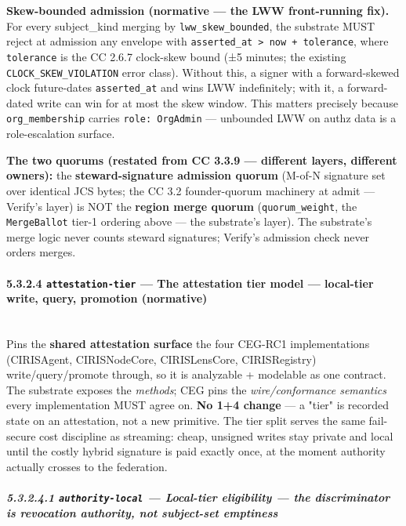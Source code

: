 \documentclass[11pt]{article}
\begin{document}
\textbf{Skew-bounded admission (normative — the LWW front-running fix).} For every subject\_kind merging by \texttt{lww\_skew\_bounded}, the substrate MUST reject at admission any envelope with \texttt{asserted\_at > now + tolerance}, where \texttt{tolerance} is the CC 2.6.7 clock-skew bound (±5 minutes; the existing \texttt{CLOCK\_SKEW\_VIOLATION} error class). Without this, a signer with a forward-skewed clock future-dates \texttt{asserted\_at} and wins LWW indefinitely; with it, a forward-dated write can win for at most the skew window. This matters precisely because \texttt{org\_membership} carries \texttt{role: OrgAdmin} — unbounded LWW on authz data is a role-escalation surface.


\textbf{The two quorums (restated from CC 3.3.9 — different layers, different owners):} the \textbf{steward-signature admission quorum} (M-of-N signature set over identical JCS bytes; the CC 3.2 founder-quorum machinery at admit — Verify's layer) is NOT the \textbf{region merge quorum} (\texttt{quorum\_weight}, the \texttt{MergeBallot} tier-1 ordering above — the substrate's layer). The substrate's merge logic never counts steward signatures; Verify's admission check never orders merges.


\paragraph{5.3.2.4 \texttt{attestation-tier} — The attestation tier model — local-tier write, query, promotion (normative)}\mbox{}\\


Pins the \textbf{shared attestation surface} the four CEG-RC1 implementations (CIRISAgent, CIRISNodeCore, CIRISLensCore, CIRISRegistry) write/query/promote through, so it is analyzable + modelable as one contract. The substrate exposes the \textit{methods}; CEG pins the \textit{wire/conformance semantics} every implementation MUST agree on. \textbf{No 1+4 change} — a "tier" is recorded state on an attestation, not a new primitive. The tier split serves the same fail-secure cost discipline as streaming: cheap, unsigned writes stay private and local until the costly hybrid signature is paid exactly once, at the moment authority actually crosses to the federation.


\subparagraph{5.3.2.4.1 \texttt{authority-local} — Local-tier eligibility — the discriminator is \textit{revocation authority}, not subject-set emptiness}\mbox{}\\
\end{document}
